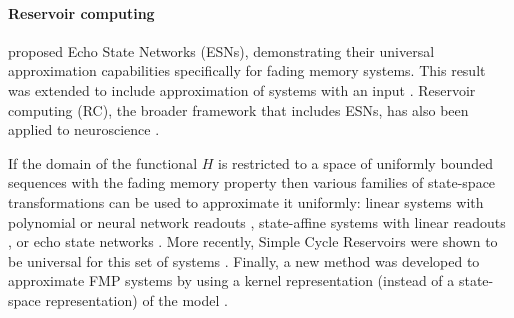 \documentclass{article}
\theoremstyle{definition} \newtheorem{definition}{Definition}
\theoremstyle{remark} \newtheorem{remark}{Remark}
\newcounter{ct}
\begin{document}
\paragraph{Reservoir computing}
\citet{jaeger2001echo} proposed Echo State Networks (ESNs), demonstrating their universal approximation capabilities specifically for fading memory systems.
This result was extended to include approximation of systems with an input \citep{manjunath2013echo}.
Reservoir computing (RC), the broader framework that includes ESNs, has also been applied to neuroscience \citep{auslender2024decoding}.


If the domain of the functional $H$ is restricted to a space of uniformly bounded sequences with the fading memory property then various families of state-space transformations can be used to approximate it uniformly: 
 linear systems with polynomial or neural network readouts \citep{boyd1985fading,grigoryeva2018universal,gonon2019reservoir}, state-affine systems with linear readouts \citep{grigoryeva2018universal}, or echo state networks \citep{grigoryeva2018echo,gonon2019reservoir,gonon2021fading,gonon2023approximation}.
 More recently, Simple Cycle Reservoirs were shown to be universal for this set of systems \citep{li2023simple}.
Finally, a new method was developed to approximate FMP systems by using a kernel representation (instead of a state-space representation) of the model \citep{huo2024kernel}. %

\end{document}
